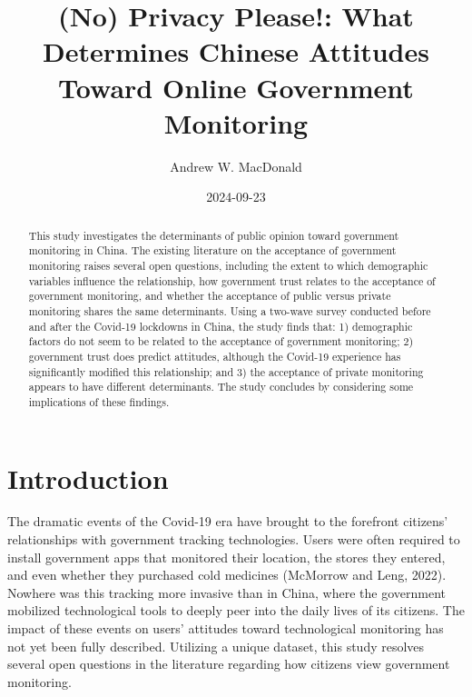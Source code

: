 \documentclass[
  letterpaper,
  DIV=11,
  numbers=noendperiod]{scrartcl}
\title{(No) Privacy Please!: What Determines Chinese Attitudes Toward
Online Government Monitoring}
\author{Andrew W. MacDonald}
\date{2024-09-23}
\begin{document}
\maketitle
\begin{abstract}
This study investigates the determinants of public opinion toward
government monitoring in China. The existing literature on the
acceptance of government monitoring raises several open questions,
including the extent to which demographic variables influence the
relationship, how government trust relates to the acceptance of
government monitoring, and whether the acceptance of public versus
private monitoring shares the same determinants. Using a two-wave survey
conducted before and after the Covid-19 lockdowns in China, the study
finds that: 1) demographic factors do not seem to be related to the
acceptance of government monitoring; 2) government trust does predict
attitudes, although the Covid-19 experience has significantly modified
this relationship; and 3) the acceptance of private monitoring appears
to have different determinants. The study concludes by considering some
implications of these findings.
\end{abstract}

\section{Introduction}\label{sec-introduction}

The dramatic events of the Covid-19 era have brought to the forefront
citizens' relationships with government tracking technologies. Users
were often required to install government apps that monitored their
location, the stores they entered, and even whether they purchased cold
medicines (McMorrow and Leng, 2022). Nowhere was this tracking more
invasive than in China, where the government mobilized technological
tools to deeply peer into the daily lives of its citizens. The impact of
these events on users' attitudes toward technological monitoring has not
yet been fully described. Utilizing a unique dataset, this study
resolves several open questions in the literature regarding how citizens
view government monitoring.
\end{document}
